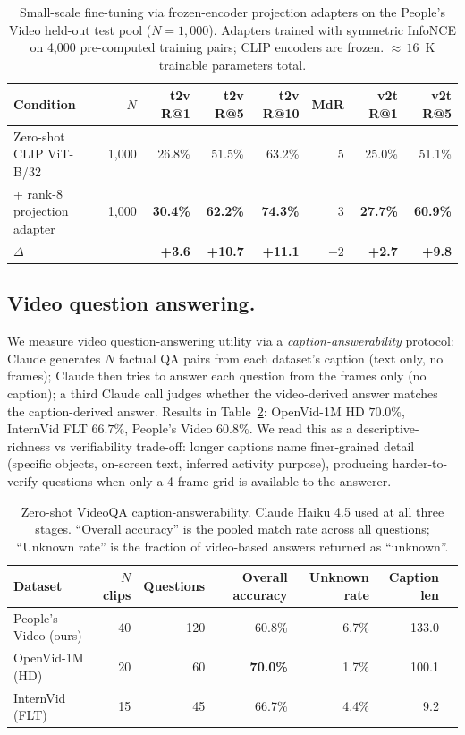 \documentclass{article}
\begin{document}
\begin{table}[t]
\centering
\caption{Small-scale fine-tuning via frozen-encoder projection adapters on the People's Video held-out test pool ($N = 1{,}000$). Adapters trained with symmetric InfoNCE on 4{,}000 pre-computed training pairs; CLIP encoders are frozen. ${\approx}\,16$~K trainable parameters total.}
\label{tab:retrieval_adapter}
\begin{tabular}{lrrrrrrr}
\toprule
Condition & $N$ & t2v R@1 & t2v R@5 & t2v R@10 & MdR & v2t R@1 & v2t R@5 \\
\midrule
Zero-shot CLIP ViT-B/32            & 1{,}000 & 26.8\% & 51.5\% & 63.2\% & 5 & 25.0\% & 51.1\% \\
\;+ rank-8 projection adapter      & 1{,}000 & \textbf{30.4\%} & \textbf{62.2\%} & \textbf{74.3\%} & 3 & \textbf{27.7\%} & \textbf{60.9\%} \\
\midrule
$\Delta$                            &          & \textbf{+3.6} & \textbf{+10.7} & \textbf{+11.1} & $-2$ & \textbf{+2.7} & \textbf{+9.8} \\
\bottomrule
\end{tabular}
\end{table}

\subsection{Video question answering.}

We measure video question-answering utility via a \emph{caption-answerability} protocol: Claude generates $N$ factual QA pairs from each dataset's caption (text only, no frames); Claude then tries to answer each question from the frames only (no caption); a third Claude call judges whether the video-derived answer matches the caption-derived answer. Results in Table~\ref{tab:videoqa}: OpenVid-1M HD $70.0\%$, InternVid FLT $66.7\%$, People's Video $60.8\%$. We read this as a descriptive-richness vs verifiability trade-off: longer captions name finer-grained detail (specific objects, on-screen text, inferred activity purpose), producing harder-to-verify questions when only a 4-frame grid is available to the answerer.

\begin{table}[t]
\centering
\caption{Zero-shot VideoQA caption-answerability. Claude Haiku 4.5 used at all three stages. ``Overall accuracy'' is the pooled match rate across all questions; ``Unknown rate'' is the fraction of video-based answers returned as ``unknown''.}
\label{tab:videoqa}
\begin{tabular}{lrrrrrr}
\toprule
Dataset & $N$ clips & Questions & Overall accuracy & Unknown rate & Caption len \\
\midrule
People's Video (ours) & 40 & 120 & 60.8\%          & 6.7\% & 133.0 \\
OpenVid-1M (HD)       & 20 & \phantom{0}60  & \textbf{70.0\%} & 1.7\% & 100.1 \\
InternVid (FLT)       & 15 & \phantom{0}45  & 66.7\%          & 4.4\% & \phantom{00}9.2 \\
\bottomrule
\end{tabular}
\end{table}
\end{document}
